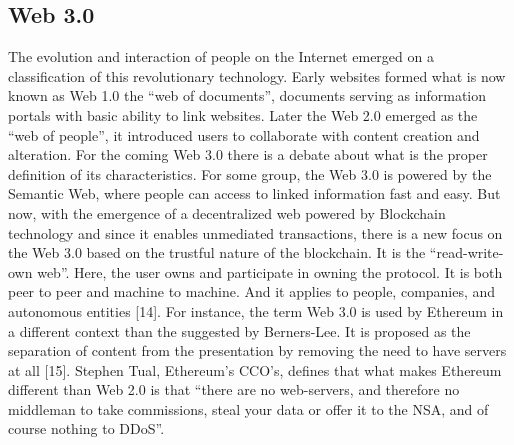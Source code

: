 \subsection{Web 3.0}\cite{Hector}
The evolution and interaction of people on the Internet
emerged on a classification of this revolutionary technology.
Early websites formed what is now known as Web 1.0 the
“web of documents”, documents serving as information portals
with basic ability to link websites. Later the Web 2.0 emerged
as the “web of people”, it introduced users to collaborate
with content creation and alteration. For the coming Web 3.0
there is a debate about what is the proper definition of its
characteristics. For some group, the Web 3.0 is powered by the
Semantic Web, where people can access to linked information
fast and easy. But now, with the emergence of a decentralized
web powered by Blockchain technology and since it enables
unmediated transactions, there is a new focus on the Web 3.0
based on the trustful nature of the blockchain. It is
the “read-write-own web”. Here, the user owns and participate
in owning the protocol. It is both peer to peer and machine
to machine. And it applies to people, companies, and
autonomous entities [14].
For instance, the term Web 3.0 is used by Ethereum in
a different context than the suggested by Berners-Lee. It is
proposed as the separation of content from the presentation
by removing the need to have servers at all [15]. Stephen
Tual, Ethereum’s CCO’s, defines that what makes Ethereum
different than Web 2.0 is that “there are no web-servers, and
therefore no middleman to take commissions, steal your data
or offer it to the NSA, and of course nothing to DDoS”.


